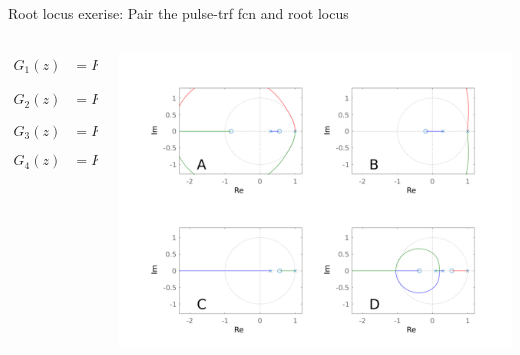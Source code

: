 \documentclass[presentation,aspectratio=169]{beamer}
\begin{document}
\begin{frame}[label={sec:org503865e}]{Root locus exerise: Pair the pulse-trf fcn and root locus}
\begin{columns}
\begin{column}{0.35\columnwidth}
 \small
\begin{align*}
  G_1(z) &= K\frac{(z+2.9)(z+0.2)}{(z-1)^2(z-0.3)}\\[3mm]
  G_2(z) &= K\frac{(z-0.5)(z+0.4)}{(z-1)(z-0.3)(z-0.1)}\\[3mm]
  G_3(z) &= K\frac{(z-0.5)(z+0.8)}{(z-1)^2(z-0.3)}\\[3mm]
  G_4(z) &= K \frac{z-0.6}{(z-1)(z-0.3)}
\end{align*}
\end{column}

\begin{column}{0.65\columnwidth}
\begin{center}
\includegraphics[width=1.04\linewidth]{../../matlab/rlocus_2x2-crop}
\end{center}
\end{column}
\end{columns}
\end{frame}
\end{document}

